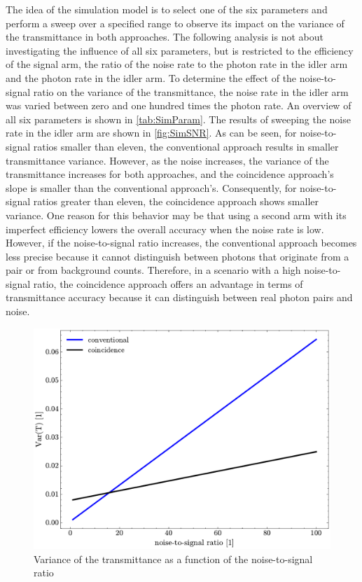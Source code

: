 The idea of the simulation model is to select one of the six parameters and perform a sweep over a specified range to observe its impact on the variance of the transmittance in both approaches. The following analysis is not about investigating the influence of all six parameters, but is restricted to the efficiency of the signal arm, the ratio of the noise rate to the photon rate in the idler arm and the photon rate in the idler arm.
To determine the effect of the noise-to-signal ratio on the variance of the transmittance, the noise rate in the idler arm was varied between zero and one hundred times the photon rate. An overview of all six parameters is shown in \autoref{tab:SimParam}.\newline
The results of sweeping the noise rate in the idler arm are shown in \autoref{fig:SimSNR}. As can be seen, for noise-to-signal ratios smaller than eleven, the conventional approach results in smaller transmittance variance. However, as the noise increases, the variance of the transmittance increases for both approaches, and the coincidence approach's slope is smaller than the conventional approach's. Consequently, for noise-to-signal ratios greater than eleven, the coincidence approach shows smaller variance. One reason for this behavior may be that using a second arm with its imperfect efficiency lowers the overall accuracy when the noise rate is low. However, if the noise-to-signal ratio increases, the conventional approach becomes less precise because it cannot distinguish between photons that originate from a pair or from background counts. Therefore, in a scenario with a high noise-to-signal ratio, the coincidence approach offers an advantage in terms of transmittance accuracy because it can distinguish between real photon pairs and noise.
\begin{figure}[b!]
	\centering
	\includegraphics[width=.7\textwidth]{Images/SimulationSweepSNR.pdf}
	\caption{Variance of the transmittance as a function of the noise-to-signal ratio}
	\label{fig:SimSNR}
\end{figure}\newline
